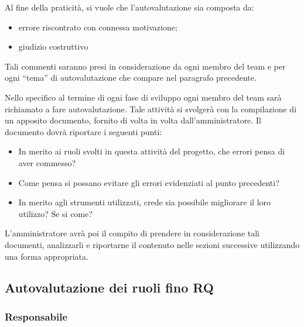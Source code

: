 Al fine della praticità, si vuole che l'autovalutazione sia composta da:

\begin{itemize}
	\item errore riscontrato con connessa motivazione;
	\item giudizio costruttivo
\end{itemize}

Tali commenti saranno presi in considerazione da ogni membro del team e per ogni ``tema'' di autovalutazione che compare nel paragrafo precedente.

Nello specifico al termine di ogni fase di sviluppo ogni membro del team sarà richiamato a fare autovalutazione. Tale attività si svolgerà con la compilazione di un apposito documento, fornito di volta in volta dall'amministratore. Il documento dovrà riportare i seguenti punti:

\begin{itemize}
	\item In merito ai ruoli svolti in questa attività del progetto, che errori pensa di aver commesso?
	\item Come pensa si possano evitare gli errori evidenziati al punto precedenti?
	\item In merito agli strumenti utilizzati, crede sia possibile migliorare il loro utilizzo? Se si come?
\end{itemize}

L'amministratore avrà poi il compito di prendere in considerazione tali documenti, analizzarli e riportarne il contenuto nelle sezioni successive utilizzando una forma appropriata.

\subsection{Autovalutazione dei ruoli fino RQ}

\subsubsection{Responsabile}

